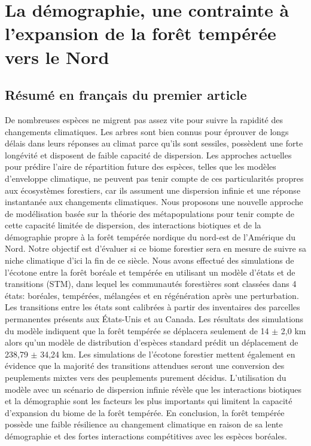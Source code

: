 
\chapter{La démographie, une contrainte à l'expansion de la forêt tempérée vers le Nord}

\section{Résumé en français du premier article}

De nombreuses espèces ne migrent pas assez vite pour suivre la rapidité des changements climatiques.
Les arbres sont bien connus pour éprouver de longs délais dans leurs réponses au climat parce qu'ils sont sessiles, possèdent une forte longévité et disposent de faible capacité de dispersion. Les approches actuelles pour prédire l'aire de répartition future des espèces, telles que les modèles d'enveloppe climatique, ne peuvent pas tenir compte de ces particularités propres aux écosystèmes forestiers, car ils assument une dispersion infinie et une réponse instantanée aux changements climatiques. Nous proposons une nouvelle approche de modélisation basée sur la théorie des métapopulations pour tenir compte de cette capacité limitée de dispersion, des interactions biotiques et de la démographie propre à la forêt tempérée nordique du nord-est de l'Amérique du Nord. Notre objectif est d'évaluer si ce biome forestier sera en mesure de suivre sa niche climatique d'ici la fin de ce siècle. Nous avons effectué des simulations de l'écotone entre la forêt boréale et tempérée en utilisant un modèle d'états et de transitions (STM), dans lequel les communautés forestières sont classées dans 4 états: boréales, tempérées, mélangées et en régénération après une perturbation. Les transitions entre les états sont calibrées à partir des inventaires des parcelles permanentes présents aux États-Unis et au Canada. Les résultats des simulations du modèle indiquent que la forêt tempérée se déplacera seulement de 14 $\pm$ 2,0 km alors qu'un modèle de distribution d'espèces standard prédit un déplacement de 238,79 $\pm$ 34,24 km. Les simulations de l'écotone forestier mettent également en évidence que la majorité des transitions attendues seront une conversion des peuplements mixtes vers des peuplements purement décidus. L'utilisation du modèle avec un scénario de dispersion infinie révèle que les interactions biotiques et la démographie sont les facteurs les plus importants qui limitent la capacité d'expansion du biome de la forêt tempérée. En conclusion, la forêt tempérée possède une faible résilience au changement climatique en raison de sa lente démographie et des fortes interactions compétitives avec les espèces boréales.

